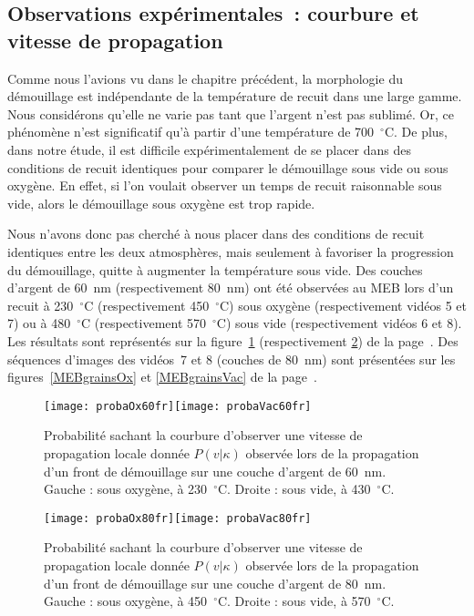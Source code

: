 		\subsection{Observations expérimentales~: courbure et vitesse de propagation}
Comme nous l’avions vu dans le chapitre précédent, la morphologie du démouillage est indépendante de la température de recuit dans une large gamme. Nous considérons qu’elle ne varie pas tant que l’argent n’est pas sublimé. Or, ce phénomène n’est significatif qu’à partir d’une température de 700~$^\circ$C. De plus, dans notre étude, il est difficile expérimentalement de se placer dans des conditions de recuit identiques pour comparer le démouillage sous vide ou sous oxygène. En effet, si l’on voulait observer un temps de recuit raisonnable sous vide, alors le démouillage sous oxygène est trop rapide.\par 
Nous n’avons donc pas cherché à nous placer dans des conditions de recuit identiques entre les deux atmosphères, mais seulement à favoriser la progression du démouillage, quitte à augmenter la température sous vide. Des couches d’argent de 60~nm (respectivement 80~nm) ont été observées au MEB lors d’un recuit à 230~$^\circ$C (respectivement 450~$^\circ$C) sous oxygène (respectivement vidéos 5 et 7)  ou à 480~$^\circ$C (respectivement 570~$^\circ$C) sous vide (respectivement vidéos 6 et 8). Les résultats sont représentés sur la figure~\ref{proba60} (respectivement \ref{proba80}) de la page~\pageref{proba60}.
Des séquences d'images des vidéos~7 et 8 (couches de 80~nm) sont présentées sur les figures~\ref{MEBgrainsOx} et \ref{MEBgrainsVac} de la page~\pageref{MEBgrainsOx}.\par 
\begin{figure}[!p]
\centering
\texttt{[image: probaOx60fr]}\texttt{[image: probaVac60fr]}
\caption{Probabilité sachant la courbure d’observer une vitesse de propagation locale donnée $P(v|\kappa)$ observée lors de la propagation d’un front de démouillage sur une couche d’argent de 60~nm. Gauche : sous oxygène, à 230~$^\circ$C. Droite : sous vide, à 430~$^\circ$C.}
\label{proba60}
\end{figure}

\begin{figure}[!p]
\centering
\texttt{[image: probaOx80fr]}\texttt{[image: probaVac80fr]}
\caption{Probabilité sachant la courbure d’observer une vitesse de propagation locale donnée $P(v|\kappa)$ observée lors de la propagation d’un front de démouillage sur une couche d’argent de 80~nm. Gauche : sous oxygène, à 450~$^\circ$C. Droite : sous vide, à 570~$^\circ$C.}
\label{proba80}
\end{figure}

